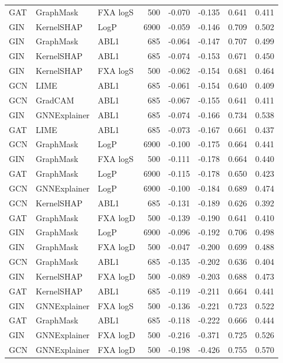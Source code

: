 \begin{table}
\begin{tabular}{lllrllll}
GAT & GraphMask & FXA logS & 500 & -0.070 & -0.135 & 0.641 & 0.411 \\
GIN & KernelSHAP & LogP & 6900 & -0.059 & -0.146 & 0.709 & 0.502 \\
GIN & GraphMask & ABL1 & 685 & -0.064 & -0.147 & 0.707 & 0.499 \\
GIN & KernelSHAP & ABL1 & 685 & -0.074 & -0.153 & 0.671 & 0.450 \\
GIN & KernelSHAP & FXA logS & 500 & -0.062 & -0.154 & 0.681 & 0.464 \\
GCN & LIME & ABL1 & 685 & -0.061 & -0.154 & 0.640 & 0.409 \\
GCN & GradCAM & ABL1 & 685 & -0.067 & -0.155 & 0.641 & 0.411 \\
GIN & GNNExplainer & ABL1 & 685 & -0.074 & -0.166 & 0.734 & 0.538 \\
GAT & LIME & ABL1 & 685 & -0.073 & -0.167 & 0.661 & 0.437 \\
GCN & GraphMask & LogP & 6900 & -0.100 & -0.175 & 0.664 & 0.441 \\
GIN & GraphMask & FXA logS & 500 & -0.111 & -0.178 & 0.664 & 0.440 \\
GAT & GraphMask & LogP & 6900 & -0.115 & -0.178 & 0.650 & 0.423 \\
GCN & GNNExplainer & LogP & 6900 & -0.100 & -0.184 & 0.689 & 0.474 \\
GCN & KernelSHAP & ABL1 & 685 & -0.131 & -0.189 & 0.626 & 0.392 \\
GAT & GraphMask & FXA logD & 500 & -0.139 & -0.190 & 0.641 & 0.410 \\
GIN & GraphMask & LogP & 6900 & -0.096 & -0.192 & 0.706 & 0.498 \\
GIN & GraphMask & FXA logD & 500 & -0.047 & -0.200 & 0.699 & 0.488 \\
GCN & GraphMask & ABL1 & 685 & -0.135 & -0.202 & 0.636 & 0.404 \\
GIN & KernelSHAP & FXA logD & 500 & -0.089 & -0.203 & 0.688 & 0.473 \\
GAT & KernelSHAP & ABL1 & 685 & -0.119 & -0.211 & 0.664 & 0.441 \\
GIN & GNNExplainer & FXA logS & 500 & -0.136 & -0.221 & 0.723 & 0.522 \\
GAT & GraphMask & ABL1 & 685 & -0.118 & -0.222 & 0.666 & 0.444 \\
GIN & GNNExplainer & FXA logD & 500 & -0.216 & -0.371 & 0.725 & 0.526 \\
GCN & GNNExplainer & FXA logD & 500 & -0.198 & -0.426 & 0.755 & 0.570 \\
\bottomrule
\end{tabular}
\end{table}
